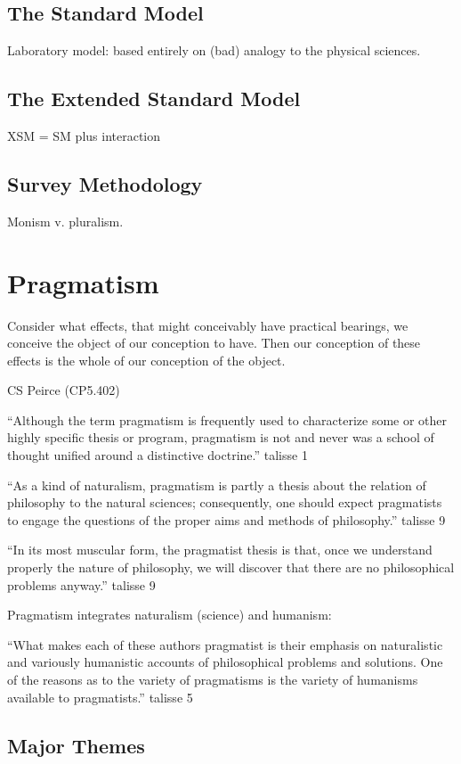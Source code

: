 \documentclass[11pt,twoside]{article}
\newcommand{\SM}{Standard Model}
\newcommand{\XSM}{Extended Standard Model}
\begin{document}
\subsection{The \SM{}}

Laboratory model: based entirely on (bad) analogy to the physical
sciences.

\subsection{The \XSM{}}

XSM = SM plus interaction

\subsection{Survey Methodology}

Monism v. pluralism.

\section{Pragmatism}

\epigraph{Consider what effects, that might conceivably have practical bearings, we conceive the object of our conception to have. Then our conception of these effects is the whole of our conception of the object.}
{CS Peirce (CP5.402)}

``Although the term pragmatism is frequently used to characterize some or other highly specific thesis or program, pragmatism is not and never was a school of thought unified around a distinctive doctrine.'' talisse 1

``As a kind of naturalism, pragmatism is partly a thesis about the
relation of philosophy to the natural sciences; consequently, one
should expect pragmatists to engage the questions of the proper aims
and methods of philosophy.'' talisse 9

``In its most muscular form, the pragmatist thesis is that, once we understand properly the nature of philosophy, we will discover that there are no philosophical problems anyway.'' talisse 9

Pragmatism integrates naturalism (science) and humanism:

``What makes each of these authors pragmatist is their emphasis on
naturalistic and variously humanistic accounts of philosophical
problems and solutions. One of the reasons as to the variety of
pragmatisms is the variety of humanisms available to pragmatists.''
talisse 5
\subsection{Major Themes}
\end{document}
